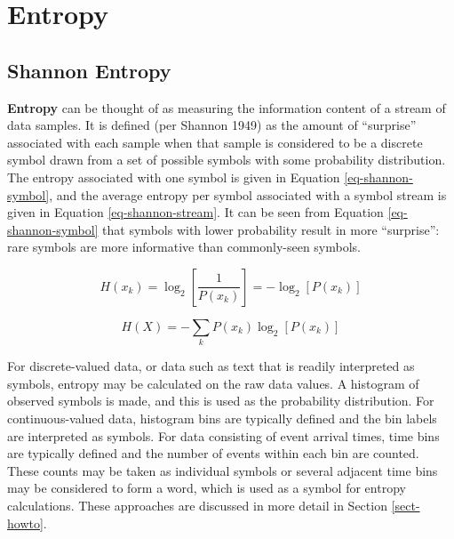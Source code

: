
\chapter{Entropy}
\label{sect-entropy}

\section{Shannon Entropy}
\label{sect-entropy-shannon}

\textbf{Entropy} can be thought of as measuring the information content of
a stream of data samples. It is defined (per Shannon 1949) as the amount of
``surprise'' associated with each sample when that sample is considered to
be a discrete symbol drawn from a set of possible symbols with some
probability distribution. The entropy associated with one symbol is given
in Equation \ref{eq-shannon-symbol}, and the average entropy per symbol
associated with a symbol stream is given in Equation
\ref{eq-shannon-stream}. It can be seen from Equation \ref{eq-shannon-symbol}
that symbols with lower probability result in more ``surprise'': rare symbols
are more informative than commonly-seen symbols.

\begin{equation}
H(x_k) = \log_2 \left [ \frac{1}{P(x_k)} \right ] = - \log_2 [ P(x_k) ]
\label{eq-shannon-symbol}
\end{equation}

\begin{equation}
H(X) = - \sum_k P(x_k) \log_2 [ P(x_k) ]
\label{eq-shannon-stream}
\end{equation}

For discrete-valued data, or data such as text that is readily interpreted
as symbols, entropy may be calculated on the raw data values. A histogram
of observed symbols is made, and this is used as the probability
distribution. For continuous-valued data, histogram bins are typically
defined and the bin labels are interpreted as symbols. For data consisting
of event arrival times, time bins are typically defined and the number of
events within each bin are counted. These counts may be taken as individual
symbols or several adjacent time bins may be considered to form a word,
which is used as a symbol for entropy calculations. These approaches are
discussed in more detail in Section \ref{sect-howto}.

\clearpage
%
